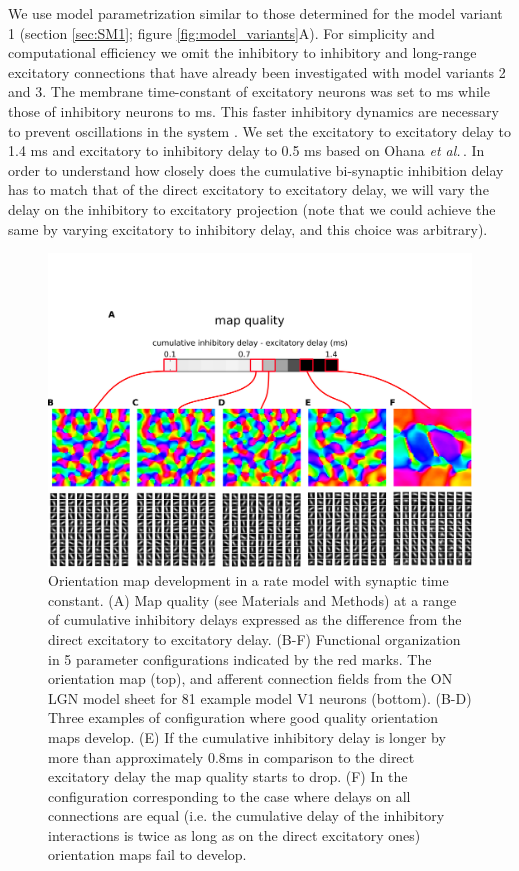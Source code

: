 \documentclass[utf8]{frontiersSCNS}
\newcommand{\etal}{\textit{et al.}}
\begin{document}
We use model parametrization similar to those determined for the
model variant 1 (section \ref{sec:SM1}; figure \ref{fig:model_variants}A). For simplicity and computational efficiency we omit the inhibitory to inhibitory and long-range excitatory connections that have already been investigated with model variants 2 and 3. The membrane time-constant of excitatory neurons was set to ms while those of inhibitory neurons to ms. This faster inhibitory dynamics are necessary to prevent oscillations in the system \citep{Kang2003}. We set the excitatory to excitatory delay to 1.4 ms and excitatory to inhibitory delay to 0.5 ms based on Ohana \etal\,\citep{Ohana2012}. In order to understand how closely does the 
cumulative bi-synaptic inhibition delay has to match that of the direct excitatory to excitatory delay, we will vary the delay on the inhibitory to excitatory projection (note that we could achieve the same by varying excitatory
to inhibitory delay, and this choice was arbitrary). 
 
\begin{figure}[htpb!] 
\centering
\includegraphics[width=16cm]{./SVG/Figure4/figure4.png}
\caption{Orientation map development in a rate model with synaptic time constant. (A) Map quality (see Materials and Methods) at a range of 
cumulative inhibitory delays expressed as the difference from the direct excitatory to excitatory delay. (B-F) Functional organization in 5 parameter configurations 
indicated by the red marks. The orientation map (top), and afferent connection fields from the ON LGN model sheet for 81 example model V1 neurons (bottom). 
(B-D) Three examples of configuration where good quality orientation maps develop. (E) If the cumulative inhibitory delay is longer by more than approximately 0.8ms in comparison
to the direct excitatory delay the map quality starts to drop. (F) In the configuration corresponding to the case where delays on all connections are equal (i.e. the cumulative delay
of the inhibitory interactions is twice as long as on the direct excitatory ones) orientation maps fail to develop.}
\label{fig:figure4}
\end{figure} 
\end{document}

